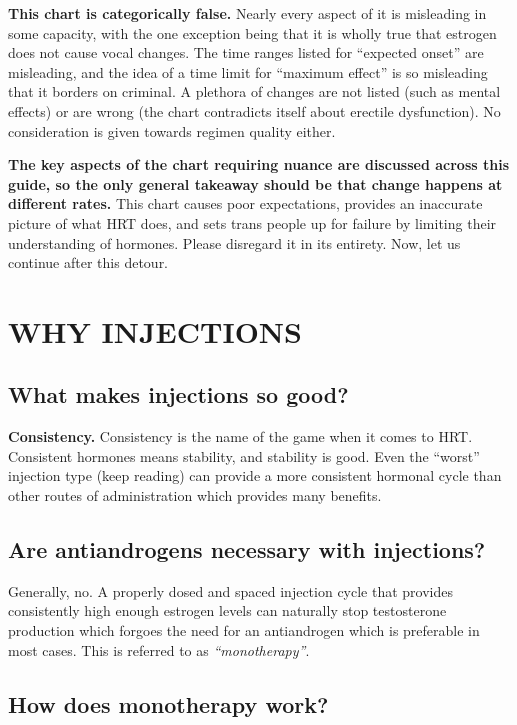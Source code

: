 \documentclass{article}
\begin{document}
\textbf{This chart is categorically false.} Nearly every aspect of it is misleading in some capacity, with the one exception being that it is wholly true that estrogen does not cause vocal changes. The time ranges listed for “expected onset” are misleading, and the idea of a time limit for “maximum effect” is so misleading that it borders on criminal. A plethora of changes are not listed (such as mental effects) or are wrong (the chart contradicts itself about erectile dysfunction). No consideration is given towards regimen quality either.

\textbf{The key aspects of the chart requiring nuance are discussed across this guide, so the only general takeaway should be that change happens at different rates.} This chart causes poor expectations, provides an inaccurate picture of what HRT does, and sets trans people up for failure by limiting their understanding of hormones. Please disregard it in its entirety. Now, let us continue after this detour.



\section{WHY INJECTIONS}

\subsection{What makes injections so good?}

\textbf{Consistency.} Consistency is the name of the game when it comes to HRT. Consistent hormones means stability, and stability is good. Even the “worst” injection type (keep reading) can provide a more consistent hormonal cycle than other routes of administration which provides many benefits.

\subsection{Are antiandrogens necessary with injections?}

Generally, no. A properly dosed and spaced injection cycle that provides consistently high enough estrogen levels can naturally stop testosterone production which forgoes the need for an antiandrogen which is preferable in most cases. This is referred to as \textit{“monotherapy”}.

\subsection{How does monotherapy work?}\label{2-3}
\end{document}
